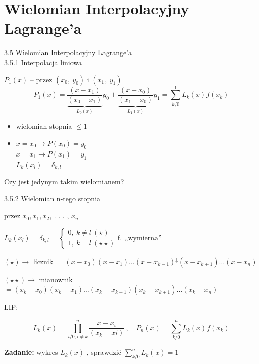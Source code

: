 \section{Wielomian Interpolacyjny Lagrange'a}

\begin{frame}{3.5 Wielomian Interpolacyjny Lagrange'a \\ 3.5.1 Interpolacja liniowa}


$P_{1}(x)$ -- przez $(x_{0},\ y_{0})$ i $(x_{1},\ y_{1})$
$$
P_{1}(x)=\underbrace{\frac{(x-x_{1})}{(x_{0}-x_{1})}}_{L_0(x)}y_{0}+\underbrace{\frac{(x-x_{0})}{(x_{1}-x_{0})}}_{L_1(x)}y_{1}=\sum_{k/0}^{1}L_{k}(x)f(x_{k})
$$
\begin{itemize}
\item wielomian stopnia $\leq 1$

\item $x=x_{0}\rightarrow P(x_{0})=y_{0}$ \\
$x=x_{1}\rightarrow P(x_{1})=y_{1}$ \\
$L_{k}(x_{l})=\delta_{k,l}$ \\
\end{itemize}
\begin{flushright}Czy jest jedynym takim wielomianem?\end{flushright}

\end{frame}


\begin{frame}{3.5.2 Wielomian $\mathrm{n}$-tego stopnia}


przez $x_{0}, x_{1}, x_{2}$, . . . , $x_{n}$

$L_{k}(x_{l})=\delta_{k,l}=\left\{\begin{array}{l}
0,\ k\neq l\ (\star)\ \\
1,\ k=l\ (\star\star)
\end{array}\right. \text{f. ,,wymierna''} $

$(\star)\rightarrow$ licznik 
$=(x-x_{0})(x-x_{1})\ldots(x-x_{k-1})^{\downarrow}(x-x_{k+1})\ldots(x-x_{n})$

$(\star\star)\rightarrow$ mianownik 
$=(x_{k}-x_{0})(x_{k}-x_{1})\ldots(x_{k}-x_{k-1})(x_{k}-x_{k+1})\ldots(x_{k}-x_{n})$

LIP:

$$L_{k}(x)=\prod_{i/0,i\neq k}^{n}\frac{x-x_{i}}{(x_{k}-xi)}\ , \quad P_{n}(x)=\sum_{k/0}^{n}L_{k}(x)f(x_{k})$$

\textbf{Zadanie:} wykres $L_{k}(x)$ , sprawdzić $\displaystyle \sum_{k/0}^{n}L_{k}(x)=1$
\end{frame}



